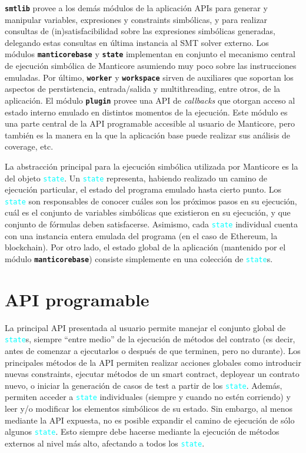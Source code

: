 \texttt{\textbf{smtlib}} provee a los demás módulos de la aplicación APIs para generar y manipular variables, expresiones y constraints simbólicas, y para realizar consultas de (in)satisfacibilidad sobre las expresiones simbólicas generadas, delegando estas consultas en última instancia al SMT solver externo.
Los módulos \texttt{\textbf{manticorebase}} y \texttt{\textbf{state}} implementan en conjunto el mecanismo central de ejecución simbólica de Manticore asumiendo muy poco sobre las instrucciones emuladas.
Por último, \texttt{\textbf{worker}} y \texttt{\textbf{workspace}} sirven de auxiliares que soportan los aspectos de perstistencia, entrada/salida y multithreading, entre otros, de la aplicación.
El módulo \texttt{\textbf{plugin}} provee una API de \textit{callbacks} que otorgan acceso al estado interno emulado en distintos momentos de la ejecución.
Este módulo es una parte central de la API programable accesible al usuario de Manticore, pero también es la manera en la que la aplicación base puede realizar sus análisis de coverage, etc.

La abstracción principal para la ejecución simbólica utilizada por Manticore es la del objeto \textcolor{cyan}{\texttt{state}}.
Un \textcolor{cyan}{\texttt{state}} representa, habiendo realizado un camino de ejecución particular, el estado del programa emulado hasta cierto punto.
Los \textcolor{cyan}{\texttt{state}} son responsables de conocer cuáles son los próximos pasos en su ejecución, cuál es el conjunto de variables simbólicas que existieron en su ejecución, y que conjunto de fórmulas deben satisfacerse.
Asimismo, cada \textcolor{cyan}{\texttt{state}} individual cuenta con una instancia entera emulada del programa (en el caso de Ethereum, la blockchain).
Por otro lado, el estado global de la aplicación (mantenido por el módulo \texttt{\textbf{manticorebase}}) consiste simplemente en una colección de \textcolor{cyan}{\texttt{state}}s.

\section{API programable}
La principal API presentada al usuario permite manejar el conjunto global de \textcolor{cyan}{\texttt{state}}s, siempre ``entre medio'' de la ejecución de métodos del contrato (es decir, antes de comenzar a ejecutarlos o después de que terminen, pero no durante).
Los principales métodos de la API permiten realizar acciones globales como introducir nuevas constraints, ejecutar métodos de un smart contract, deployear un contrato nuevo, o iniciar la generación de casos de test a partir de los \textcolor{cyan}{\texttt{state}}.
Además, permiten acceder a \textcolor{cyan}{\texttt{state}} individuales (siempre y cuando no estén corriendo) y leer y/o modificar los elementos simbólicos de su estado.
Sin embargo, al menos mediante la API expuesta, no es posible expandir el camino de ejecución de sólo algunos \textcolor{cyan}{\texttt{state}}.
Esto siempre debe hacerse mediante la ejecución de métodos externos al nivel más alto, afectando a todos los \textcolor{cyan}{\texttt{state}}.

